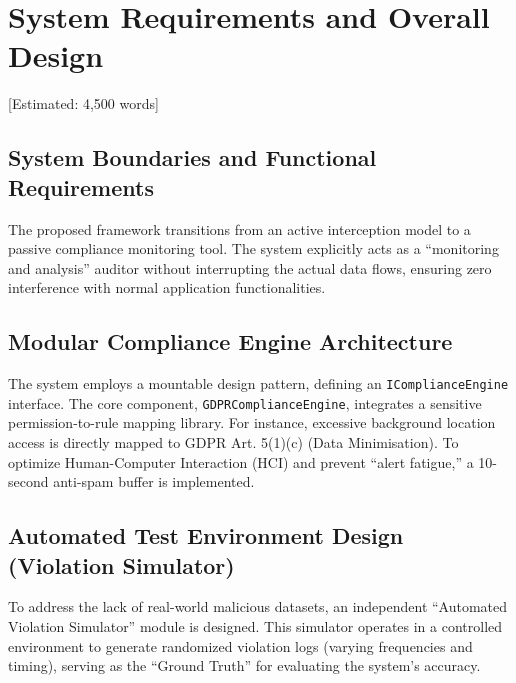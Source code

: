 \newpage
\section{System Requirements and Overall Design} [Estimated: 4,500 words]

\subsection{System Boundaries and Functional Requirements}
The proposed framework transitions from an active interception model to a passive compliance monitoring tool. The system explicitly acts as a ``monitoring and analysis'' auditor without interrupting the actual data flows, ensuring zero interference with normal application functionalities.

\subsection{Modular Compliance Engine Architecture}
The system employs a mountable design pattern, defining an \texttt{IComplianceEngine} interface. The core component, \texttt{GDPRComplianceEngine}, integrates a sensitive permission-to-rule mapping library. For instance, excessive background location access is directly mapped to GDPR Art. 5(1)(c) (Data Minimisation). To optimize Human-Computer Interaction (HCI) and prevent ``alert fatigue,'' a 10-second anti-spam buffer is implemented.

\subsection{Automated Test Environment Design (Violation Simulator)}
To address the lack of real-world malicious datasets, an independent ``Automated Violation Simulator'' module is designed. This simulator operates in a controlled environment to generate randomized violation logs (varying frequencies and timing), serving as the ``Ground Truth'' for evaluating the system's accuracy.